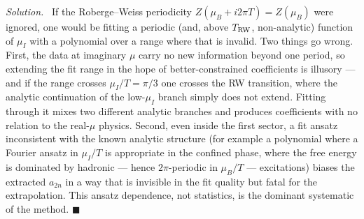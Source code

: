 \documentclass[11pt]{article}
\newenvironment{solution}{\par\smallskip\noindent\textit{Solution.}\ }{\hfill$\blacksquare$\par\smallskip}
\begin{document}
\begin{solution}
If the Roberge--Weiss periodicity $Z(\mu_B + i2\pi T) = Z(\mu_B)$ were ignored, one would be fitting a periodic (and, above $T_{\rm RW}$, non-analytic) function of $\mu_I$ with a polynomial over a range where that is invalid. Two things go wrong. First, the data at imaginary $\mu$ carry no new information beyond one period, so extending the fit range in the hope of better-constrained coefficients is illusory --- and if the range crosses $\mu_I/T = \pi/3$ one crosses the RW transition, where the analytic continuation of the low-$\mu_I$ branch simply does not extend. Fitting through it mixes two different analytic branches and produces coefficients with no relation to the real-$\mu$ physics. Second, even inside the first sector, a fit ansatz inconsistent with the known analytic structure (for example a polynomial where a Fourier ansatz in $\mu_I/T$ is appropriate in the confined phase, where the free energy is dominated by hadronic --- hence $2\pi$-periodic in $\mu_B/T$ --- excitations) biases the extracted $a_{2n}$ in a way that is invisible in the fit quality but fatal for the extrapolation. This ansatz dependence, not statistics, is the dominant systematic of the method.
\end{solution}
\end{document}
